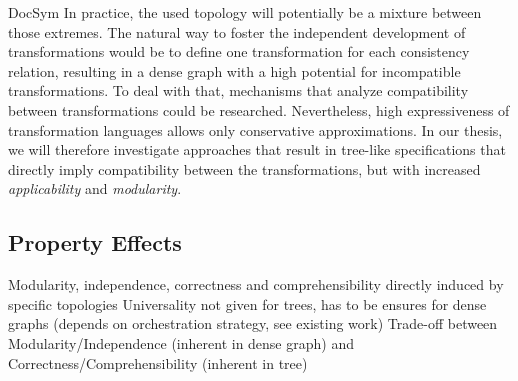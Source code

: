 \begin{copiedFrom}{DocSym}
In practice, the used topology will potentially be a mixture between those extremes.
The natural way to foster the independent development of transformations %
would be to define one transformation for each consistency relation, resulting in a dense graph with a high potential for incompatible transformations.
To deal with that, mechanisms that analyze compatibility between transformations could be researched.
Nevertheless, high expressiveness of transformation languages allows only conservative approximations. %
In our thesis, we will therefore investigate approaches that result in tree-like specifications that directly imply compatibility between the transformations, but with increased \emph{applicability} and \emph{modularity}. %

\end{copiedFrom} %

\subsection{Property Effects}

Modularity, independence, correctness and comprehensibility directly induced by specific topologies
Universality not given for trees, has to be ensures for dense graphs (depends on orchestration strategy, see existing work)
Trade-off between Modularity/Independence (inherent in dense graph) and Correctness/Comprehensibility (inherent in tree)


